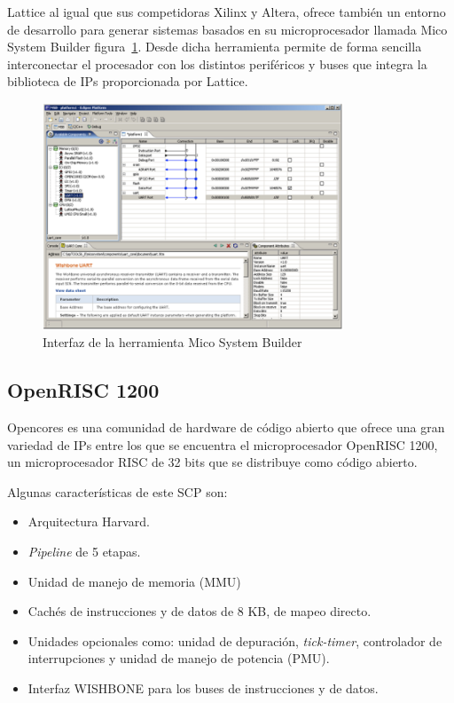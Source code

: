 Lattice al igual que sus competidoras Xilinx y Altera, ofrece también un entorno de desarrollo para generar sistemas basados en su microprocesador
llamada Mico System Builder figura~\ref{fig:msb}. Desde dicha herramienta permite de forma sencilla interconectar el procesador con los distintos periféricos y buses que
integra la biblioteca de IPs proporcionada por Lattice.

\begin{figure}[h!]
 	\begin{center}
  	\includegraphics[width=0.8\textwidth,keepaspectratio=true]{./images/herramientaslatice}
  	\caption{Interfaz de la herramienta Mico System Builder}
  	\label{fig:msb}
 	\end{center}
	\end{figure}
\newpage
	\subsection{OpenRISC 1200}

Opencores \cite{Etiqueta20} es una comunidad de hardware de código abierto que ofrece una gran variedad de IPs entre los que se encuentra el microprocesador OpenRISC 1200, un microprocesador RISC de 32 bits que se distribuye como código abierto.

Algunas características de este SCP son:

\begin{itemize}
		 \item  Arquitectura Harvard.
	 	 \item \textit{Pipeline} de 5 etapas.
	 	 \item  Unidad de manejo de memoria (MMU)
		 \item  Cachés de instrucciones y de datos de 8 KB, de mapeo directo.
 		\item Unidades opcionales como: unidad de depuración,\textit{ tick-timer}, controlador de interrupciones y unidad de manejo de potencia (PMU).
		\item Interfaz WISHBONE para los buses de instrucciones y de datos.
\end{itemize}
  
